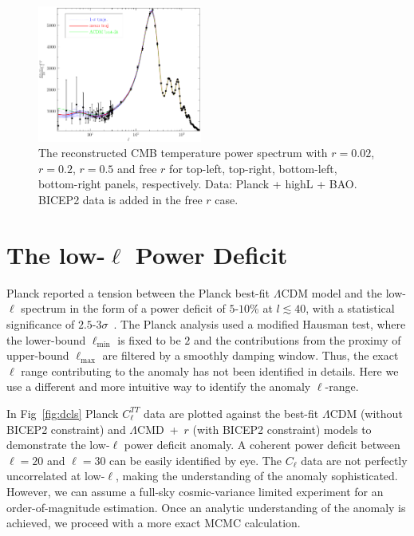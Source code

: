 \documentclass[11pt]{article}
\def \halffigwidth{0.48\textwidth}
\begin{document}
\begin{figure}
\includegraphics[width = \halffigwidth]{spline0_p11_clTT_trajs.pdf}
\caption{The reconstructed CMB temperature power spectrum with $r = 0.02$, $r=0.2$, $r=0.5$ and free $r$ for top-left, top-right, bottom-left, bottom-right panels, respectively. Data: Planck + highL + BAO. BICEP2 data is added in the free $r$ case. \label{fig:traj_cltt}}
\end{figure}

\section{The low-$\ell$ Power Deficit \label{sec:anomaly}}

Planck reported a tension between the Planck best-fit $\Lambda$CDM model and the low-$\ell$ spectrum in the form of a power deficit of $5$-$10$\% at $l\lesssim 40$, with a statistical significance of $2.5$-$3\sigma$~\cite{Planck2013PowerSpectra}. The Planck analysis used a modified Hausman test, where the lower-bound $\ell_{\min}$ is fixed to be $2$ and the contributions from the proximy of upper-bound $\ell_{\max}$ are filtered by a smoothly damping window. Thus, the exact $\ell$ range contributing to the anomaly has not been identified in details. Here we use a different and more intuitive way to identify the anomaly $\ell$-range.


In Fig~\ref{fig:dcls} Planck $C_\ell^{TT}$ data are plotted against the best-fit $\Lambda$CDM (without BICEP2 constraint) and $\Lambda$CMD~+~$r$ (with BICEP2 constraint) models to demonstrate the low-$\ell$ power deficit anomaly. A coherent power deficit between $\ell=20$ and $\ell = 30$ can be easily identified by eye. The $C_{\ell}$ data are not perfectly uncorrelated at low-$\ell$, making the understanding of the anomaly sophisticated. However, we can assume a full-sky cosmic-variance limited experiment for an order-of-magnitude estimation. Once an analytic understanding of the anomaly is achieved, we proceed with a more exact MCMC calculation.
\end{document}
